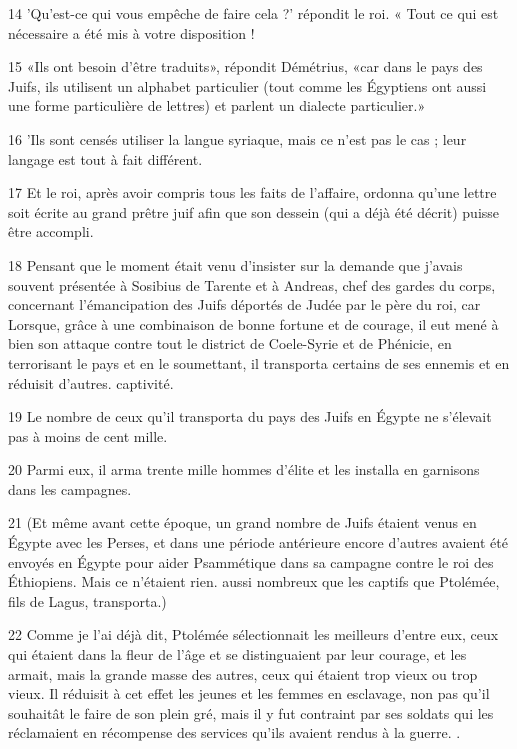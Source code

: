 \par 14 'Qu'est-ce qui vous empêche de faire cela ?' répondit le roi. « Tout ce qui est nécessaire a été mis à votre disposition !

\par 15 «Ils ont besoin d'être traduits», répondit Démétrius, «car dans le pays des Juifs, ils utilisent un alphabet particulier (tout comme les Égyptiens ont aussi une forme particulière de lettres) et parlent un dialecte particulier.»

\par 16 'Ils sont censés utiliser la langue syriaque, mais ce n'est pas le cas ; leur langage est tout à fait différent.

\par 17 Et le roi, après avoir compris tous les faits de l'affaire, ordonna qu'une lettre soit écrite au grand prêtre juif afin que son dessein (qui a déjà été décrit) puisse être accompli.

\par 18 Pensant que le moment était venu d'insister sur la demande que j'avais souvent présentée à Sosibius de Tarente et à Andreas, chef des gardes du corps, concernant l'émancipation des Juifs déportés de Judée par le père du roi, car Lorsque, grâce à une combinaison de bonne fortune et de courage, il eut mené à bien son attaque contre tout le district de Coele-Syrie et de Phénicie, en terrorisant le pays et en le soumettant, il transporta certains de ses ennemis et en réduisit d'autres. captivité.

\par 19 Le nombre de ceux qu'il transporta du pays des Juifs en Égypte ne s'élevait pas à moins de cent mille.

\par 20 Parmi eux, il arma trente mille hommes d'élite et les installa en garnisons dans les campagnes.

\par 21 (Et même avant cette époque, un grand nombre de Juifs étaient venus en Égypte avec les Perses, et dans une période antérieure encore d'autres avaient été envoyés en Égypte pour aider Psammétique dans sa campagne contre le roi des Éthiopiens. Mais ce n'étaient rien. aussi nombreux que les captifs que Ptolémée, fils de Lagus, transporta.)

\par 22 Comme je l'ai déjà dit, Ptolémée sélectionnait les meilleurs d'entre eux, ceux qui étaient dans la fleur de l'âge et se distinguaient par leur courage, et les armait, mais la grande masse des autres, ceux qui étaient trop vieux ou trop vieux. Il réduisit à cet effet les jeunes et les femmes en esclavage, non pas qu'il souhaitât le faire de son plein gré, mais il y fut contraint par ses soldats qui les réclamaient en récompense des services qu'ils avaient rendus à la guerre. .

